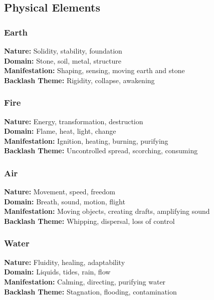 \subsection{Physical Elements}

\subsubsection{Earth}
\textbf{Nature:} Solidity, stability, foundation\\
\textbf{Domain:} Stone, soil, metal, structure\\
\textbf{Manifestation:} Shaping, sensing, moving earth and stone\\
\textbf{Backlash Theme:} Rigidity, collapse, awakening

\subsubsection{Fire}
\textbf{Nature:} Energy, transformation, destruction\\
\textbf{Domain:} Flame, heat, light, change\\
\textbf{Manifestation:} Ignition, heating, burning, purifying\\
\textbf{Backlash Theme:} Uncontrolled spread, scorching, consuming

\subsubsection{Air}
\textbf{Nature:} Movement, speed, freedom\\
\textbf{Domain:} Breath, sound, motion, flight\\
\textbf{Manifestation:} Moving objects, creating drafts, amplifying sound\\
\textbf{Backlash Theme:} Whipping, dispersal, loss of control

\subsubsection{Water}
\textbf{Nature:} Fluidity, healing, adaptability\\
\textbf{Domain:} Liquids, tides, rain, flow\\
\textbf{Manifestation:} Calming, directing, purifying water\\
\textbf{Backlash Theme:} Stagnation, flooding, contamination

